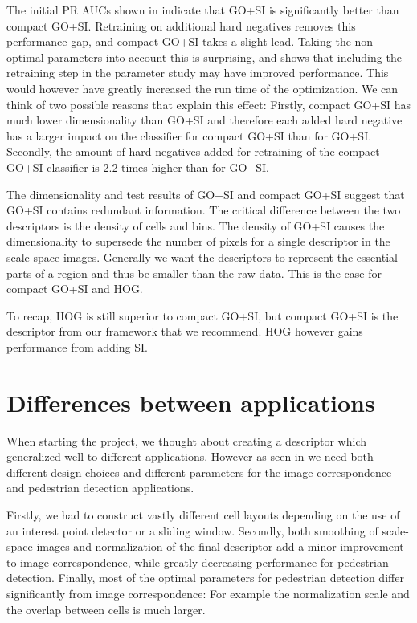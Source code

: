 \documentclass[thesis.tex]{subfiles}
\begin{document}
The initial PR AUCs shown in  indicate that GO+SI is significantly better than compact GO+SI. Retraining on additional hard negatives removes this performance gap, and compact GO+SI takes a slight lead. Taking the non-optimal parameters into account this is surprising, and shows that including the retraining step in the parameter study may have improved performance.  This would however have greatly increased the run time of the optimization. We can think of two possible reasons that explain this effect: Firstly, compact GO+SI has much lower dimensionality than GO+SI and therefore each added hard negative has a larger impact on the classifier for compact GO+SI than for GO+SI. Secondly, the amount of hard negatives added for retraining of the compact GO+SI classifier is 2.2 times higher than for GO+SI.

The dimensionality and test results of GO+SI and compact GO+SI suggest that GO+SI contains redundant information. The critical difference between the two descriptors is the density of cells and bins. The density of GO+SI causes the dimensionality to supersede the number of pixels for a single descriptor in the scale-space images. Generally we want the descriptors to represent the essential parts of a region and thus be smaller than the raw data. This is the case for compact GO+SI and HOG.

To recap, HOG is still superior to compact GO+SI, but compact GO+SI is the descriptor from our framework that we recommend. HOG however gains performance from adding SI.

\section{Differences between applications}
When starting the project, we thought about creating a descriptor which generalized well to different applications. However as seen in  we need both different design choices and different parameters for the image correspondence and pedestrian detection applications.

Firstly, we had to construct vastly different cell layouts depending on the use of an interest point detector or a sliding window. Secondly, both smoothing of scale-space images and normalization of the final descriptor add a minor improvement to image correspondence, while greatly decreasing performance for pedestrian detection. Finally, most of the optimal parameters for pedestrian detection differ significantly from image correspondence: For example the normalization scale and the overlap between cells is much larger.
\end{document}

